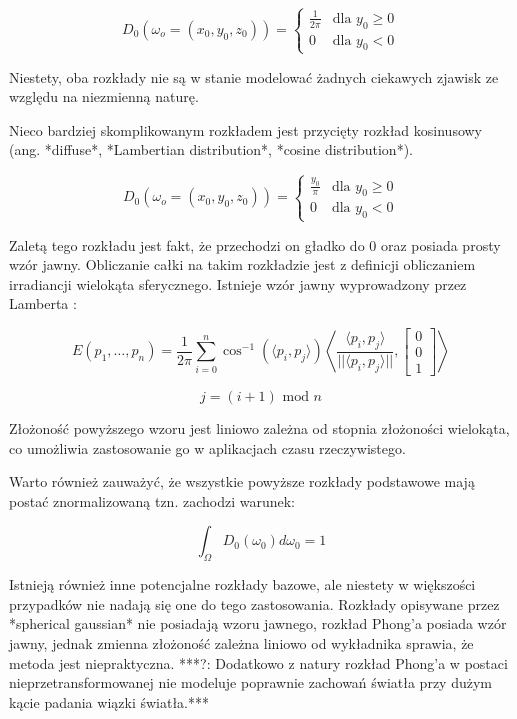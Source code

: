 \documentclass[../main.tex]{subfiles}
\begin{document}
$$
D_0(\omega_o=(x_0, y_0, z_0)) = \begin{cases}
  \frac{1}{2\pi} & \text{dla } y_0 \geq 0 \\
  0 & \text{dla } y_0 < 0
\end{cases}
$$

Niestety, oba rozkłady nie są w stanie modelować żadnych ciekawych zjawisk
ze względu na niezmienną naturę.

Nieco bardziej skomplikowanym rozkładem jest przycięty rozkład kosinusowy
(ang. *diffuse*, *Lambertian distribution*, *cosine distribution*).

$$
D_0(\omega_o=(x_0, y_0, z_0)) = \begin{cases}
  \frac{y_0}{\pi} & \text{dla } y_0 \geq 0 \\
  0 & \text{dla } y_0 < 0
\end{cases}
$$

Zaletą tego rozkładu jest fakt, że przechodzi on gładko do 0 oraz posiada
prosty wzór jawny. Obliczanie całki na takim rozkładzie jest z definicji
obliczaniem irradiancji wielokąta sferycznego. Istnieje wzór jawny
wyprowadzony przez Lamberta \cite{Baum}:

$$
E(p_1, \ldots, p_n) =
\frac{1}{2\pi}
\sum_{i=0}^{n} {
  \cos^{-1}(\langle p_i, p_j \rangle)
  \left\langle {
    \frac{\langle p_i, p_j \rangle}{||\langle p_i, p_j \rangle||},
    \left[ \begin{matrix} 0 \\ 0 \\ 1 \end{matrix} \right]
  } \right\rangle
}
$$

$$
j = (i+1) \text{ mod } n
$$

Złożoność powyższego wzoru jest liniowo zależna od stopnia złożoności
wielokąta, co umożliwia zastosowanie go w aplikacjach czasu rzeczywistego.

Warto również zauważyć, że wszystkie powyższe rozkłady podstawowe mają
postać znormalizowaną tzn. zachodzi warunek:

$$
\int_\Omega {
  D_0(\omega_0)
  d \omega_0
} = 1
$$

Istnieją również inne potencjalne rozkłady bazowe, ale niestety
w większości przypadków nie nadają się one do tego zastosowania. Rozkłady
opisywane przez *spherical gaussian* nie posiadają wzoru jawnego, rozkład
Phong’a posiada wzór jawny, jednak zmienna złożoność zależna liniowo od
wykładnika sprawia, że metoda jest niepraktyczna. ***?: Dodatkowo z natury
rozkład Phong’a w postaci nieprzetransformowanej nie modeluje poprawnie
zachowań światła przy dużym kącie padania wiązki światła.***
\end{document}
